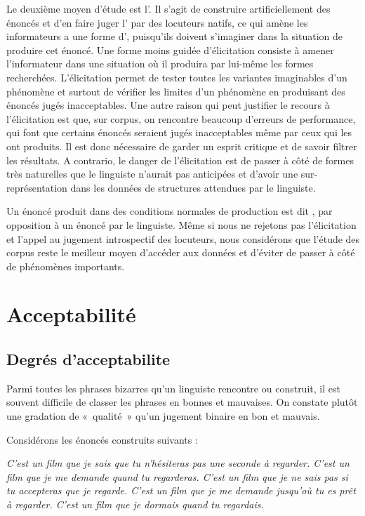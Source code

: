 Le deuxième moyen d’étude est l'. Il s’agit de construire artificiellement des énoncés et d’en faire juger l’ par des locuteurs natifs, ce qui amène les informateurs a une forme d', puisqu'ils doivent s'imaginer dans la situation de produire cet énoncé. Une forme moins guidée d'élicitation consiste à amener l'informateur dans une situation où il produira par lui-même les formes recherchées. L'élicitation permet de tester toutes les variantes imaginables d’un phénomène et surtout de vérifier les limites d’un phénomène en produisant des énoncés jugés inacceptables. Une autre raison qui peut justifier le recours à l’élicitation est que, sur corpus, on rencontre beaucoup d’erreurs de performance, qui font que certains énoncés seraient jugés inacceptables même par ceux qui les ont produits. Il est donc nécessaire de garder un esprit critique et de savoir filtrer les résultats. A contrario, le danger de l'élicitation est de passer à côté de formes très naturelles que le linguiste n'aurait pas anticipées et d'avoir une sur-représentation dans les données de structures attendues par le linguiste.

Un énoncé produit dans des conditions normales de production est dit , par opposition à un énoncé  par le linguiste. Même si nous ne rejetons pas l’élicitation et l’appel au jugement introspectif des locuteurs, nous considérons que l’étude des corpus reste le meilleur moyen d’accéder aux données et d’éviter de passer à côté de phénomènes importants. 

\section{Acceptabilité}\label{sec:1.1.11}
\subsection{Degrés d'acceptabilite}
Parmi toutes les phrases bizarres qu’un linguiste rencontre ou construit, il est souvent difficile de classer les phrases en bonnes et mauvaises. On constate plutôt une gradation de «~qualité~» qu’un jugement binaire en bon et mauvais.

Considérons les énoncés construits suivants :

\ea
\ea \itshape C’est un film que je sais que tu n’hésiteras pas une seconde à regarder.
\ex \itshape C’est un film que je me demande quand tu regarderas.
\ex \itshape C’est un film que je ne sais pas si tu accepteras que je regarde.
\ex \itshape C’est un film que je me demande jusqu’où tu es prêt à regarder.
\ex \itshape C’est un film que je dormais quand tu regardais.
\z
\z


